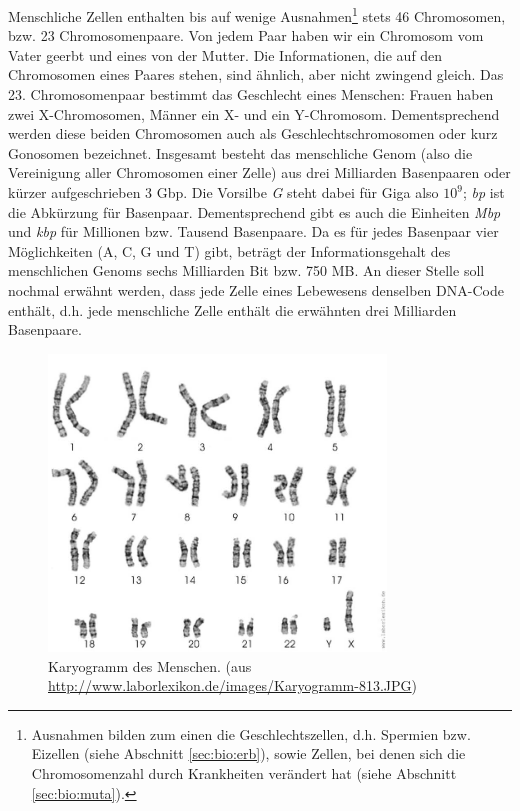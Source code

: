 Menschliche Zellen enthalten bis auf wenige Ausnahmen\footnote{Ausnahmen bilden zum einen die Geschlechtszellen, d.h. Spermien bzw. Eizellen (siehe Abschnitt \ref{sec:bio:erb}), sowie Zellen, bei denen sich die Chromosomenzahl durch Krankheiten verändert hat (siehe Abschnitt \ref{sec:bio:muta}).} stets 46 Chromosomen, bzw. 23 Chromosomenpaare. Von jedem Paar haben wir ein Chromosom vom Vater geerbt und eines von der Mutter. Die Informationen, die auf den Chromosomen eines Paares stehen, sind ähnlich, aber nicht zwingend gleich. Das 23. Chromosomenpaar bestimmt das Geschlecht eines Menschen: Frauen haben zwei X-Chromosomen, Männer ein X- und ein Y-Chromosom. Dementsprechend werden diese beiden Chromosomen auch als Geschlechtschromosomen oder kurz Gonosomen bezeichnet. Insgesamt besteht das menschliche Genom (also die Vereinigung aller Chromosomen einer Zelle) aus drei Milliarden Basenpaaren oder kürzer aufgeschrieben 3 Gbp. Die Vorsilbe \emph{G} steht dabei für Giga also $10^9$; \emph{bp} ist die Abkürzung für Basenpaar. Dementsprechend gibt es auch die Einheiten \emph{Mbp} und \emph{kbp} für Millionen bzw. Tausend Basenpaare. Da es für jedes Basenpaar vier Möglichkeiten (A, C, G und T) gibt, beträgt der Informationsgehalt des menschlichen Genoms sechs Milliarden Bit bzw. 750 MB. An dieser Stelle soll nochmal erwähnt werden, dass jede Zelle eines Lebewesens denselben DNA-Code enthält, d.h. jede menschliche Zelle enthält die erwähnten drei Milliarden Basenpaare. 

\begin{figure}[htbp]
\begin{center}
\includegraphics[width=0.8\textwidth]{bilder/Karyogramm}
\end{center}
\caption{Karyogramm des Menschen. (aus \protect\url{http://www.laborlexikon.de/images/Karyogramm-813.JPG})}
\label{fig:bio:chromo:karyogramm}
\end{figure}


